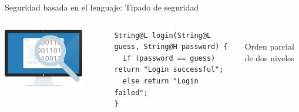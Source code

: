 \documentclass[aspectratio=169,10pt]{beamer}
\begin{document}
\begin{frame}[fragile]{Seguridad basada en el lenguaje: Tipado de seguridad}
	\begin{columns}[T,onlytextwidth]
		\includegraphics[width=0.8\textwidth]{images/lbs.png}
		\begin{lstlisting}[basicstyle=\fontsize{6.3}{8}\ttfamily]
String@L login(String@L guess, String@H password) {
  if (password == guess) return "Login successful";
  else return "Login failed";
}
    \end{lstlisting}
		\begin{center}
			 \\
			Orden parcial de dos niveles
		\end{center}
	\end{columns}
\end{frame}
\end{document}
